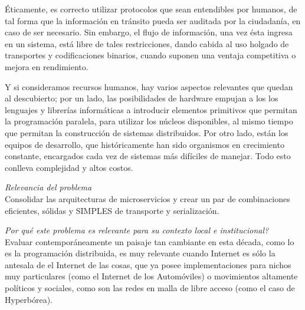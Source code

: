 Éticamente, es correcto utilizar protocolos que sean entendibles por humanos, de tal forma que la información en tránsito pueda ser auditada por la ciudadanía, en caso de ser necesario. Sin embargo, el flujo de información, una vez ésta ingresa en un sistema, está libre de tales restricciones, dando cabida al uso holgado de transportes y codificaciones binarios, cuando suponen una ventaja competitiva o mejora en rendimiento.

Y si consideramos recursos humanos, hay varios aspectos relevantes que quedan al descubierto; por un lado, las posibilidades de hardware empujan a los los lenguajes y librerías informáticas a introducir elementos primitivos que permitan la programación paralela, para utilizar los núcleos disponibles, al mismo tiempo que permitan la construcción de sistemas distribuidos. Por otro lado, están los equipos de desarrollo, que históricamente han sido organismos en crecimiento constante, encargados cada vez de sistemas más difíciles de manejar. Todo esto conlleva complejidad y altos costos.

\textit {Relevancia del problema}\\

Consolidar las arquitecturas de microservicios y crear un par de combinaciones eficientes, sólidas y SIMPLES de transporte y serialización.

\textit {Por qué este problema es relevante para su contexto local e institucional?}\\

Evaluar contemporáneamente un paisaje tan cambiante en esta década, como lo es la programación distribuida, es muy relevante cuando Internet es sólo la antesala de el Internet de las cosas, que ya posee implementaciones para nichos muy particulares (como el Internet de los Automóviles) o movimientos altamente políticos y sociales, como son las redes en malla de libre acceso (como el caso de Hyperbórea).

